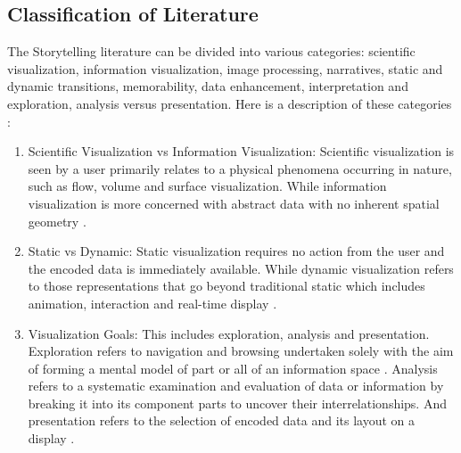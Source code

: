 \documentclass{egpubl}
\begin{document}
\subsection{Classification of Literature}
The Storytelling literature can be divided into various categories: scientific visualization, information visualization, image processing, narratives, static and dynamic transitions, memorability, data enhancement, interpretation and exploration, analysis versus presentation. Here is a description of these categories :
\begin{enumerate}
\item Scientific Visualization vs Information Visualization: Scientific visualization is seen by a user primarily relates to a physical phenomena occurring in nature, such as flow, volume and surface visualization. While information visualization is more concerned with abstract data with no inherent spatial geometry \cite{spence2007}.
\item Static vs Dynamic: Static visualization requires no action from the user and the encoded data is immediately available. While dynamic visualization refers to those representations that go beyond traditional static which includes animation, interaction and real-time display \cite{spence2007}.
\item Visualization Goals: This includes exploration, analysis and presentation. Exploration refers to navigation and browsing undertaken solely with the aim of forming a mental model of part or all of an information space \cite{spence2007}. Analysis refers to a systematic examination and evaluation of data or information by breaking it into its component parts to uncover their interrelationships. And presentation refers to the selection of encoded data and its layout on a display \cite{spence2007}.
\end{enumerate}
\end{document}

